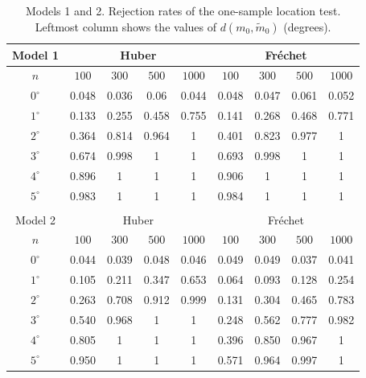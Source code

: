 \documentclass[preprint]{imsart}
\def\Frechet{Fr\'{e}chet}
\theoremstyle{plain}
\theoremstyle{remark}
\begin{document}
\begin{appendix}
\begin{table}[t]
\centering
\caption{Models 1 and 2. Rejection rates of the one-sample location test. Leftmost column shows the values of $d(m_0,\tilde{m}_0)$ (degrees). }
\label{tab:comparison2}
\begin{tabular}{c|cccc|cccc}
\hline
Model 1 & \multicolumn{4}{c|}{Huber} & \multicolumn{4}{c}{\Frechet} \\
\hline
$n$  & $100$& $300$ & $500$ & $1000 $
& $100$& $300$ & $500$ & $1000 $\\ \hline
$0^\circ$ & 0.048 & 0.036 & 0.06 & 0.044 & 0.048 & 0.047 & 0.061 & 0.052 \\ 
$1^\circ$ & 0.133 & 0.255 & 0.458 & 0.755 & 0.141 & 0.268 & 0.468 & 0.771 \\
$2^\circ$ & 0.364 & 0.814 & 0.964 & 1 & 0.401 & 0.823 & 0.977 & 1 \\
$3^\circ$ & 0.674 & 0.998 & 1 & 1 & 0.693 & 0.998 & 1 & 1 \\ 
$4^\circ$ & 0.896 & 1 & 1 & 1 & 0.906 & 1 & 1 & 1 \\
$5^\circ$ & 0.983 & 1 & 1 & 1 & 0.984 & 1 & 1 & 1 \\ 
\hline
\\
\hline
Model 2 & \multicolumn{4}{c|}{Huber} & \multicolumn{4}{c}{\Frechet} \\
\hline
$n$  & $100$& $300$ & $500$ & $1000 $
& $100$& $300$ & $500$ & $1000 $\\ \hline
$0^\circ$ &  0.044 & 0.039 & 0.048 & 0.046 & 0.049 & 0.049 & 0.037 & 0.041 \\
$1^\circ$ &     0.105 & 0.211 & 0.347 & 0.653 & 0.064 & 0.093 & 0.128 & 0.254 \\
$2^\circ$ &     0.263 & 0.708 & 0.912 & 0.999 & 0.131 & 0.304 & 0.465 & 0.783 \\
$3^\circ$ &      0.540 & 0.968 & 1 & 1 & 0.248 & 0.562 & 0.777 & 0.982 \\
$4^\circ$ &    0.805 & 1 & 1 & 1 & 0.396 & 0.850 & 0.967 & 1 \\
$5^\circ$ &    0.950 & 1 & 1 & 1 & 0.571 & 0.964 & 0.997 & 1 \\   \hline
\end{tabular}
\end{table}
 


\end{appendix}
\end{document}
